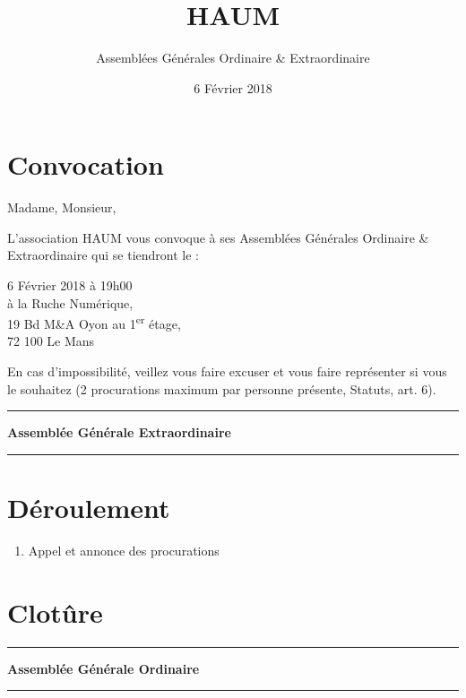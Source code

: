 \documentclass[11pt]{article}
\title{HAUM}
\author{Assemblées Générales Ordinaire \& Extraordinaire}
\date{6 Février 2018}
\begin{document}
\maketitle


\section*{Convocation}

Madame, Monsieur,

L'association HAUM vous convoque à ses Assemblées Générales Ordinaire \& Extraordinaire qui se tiendront le :

\begin{center}
{\Large 6 Février 2018 à 19h00}\\
à la Ruche Numérique,\\19 Bd M\&A Oyon au 1\textsuperscript{er} étage,\\72 100 Le Mans
\end{center}

En cas d'impossibilité, veillez vous faire excuser et vous faire représenter si vous le souhaitez (2 procurations maximum par personne présente, Statuts, art. 6).

\vspace{1.5cm}

\hrule
\vspace{.3cm}
\begin{center}
\Large\bfseries Assemblée Générale Extraordinaire
\end{center}
\vspace{.3cm}
\hrule

\vspace{1.5cm}

\section*{Déroulement}

\begin{enumerate}
    \item Appel et annonce des procurations
\end{enumerate}

\section*{Clotûre}

\vspace{1.5cm}

\hrule
\vspace{.6cm}
\begin{center}
\Large\bfseries Assemblée Générale Ordinaire
\end{center}
\vspace{.3cm}
\hrule
\end{document}
